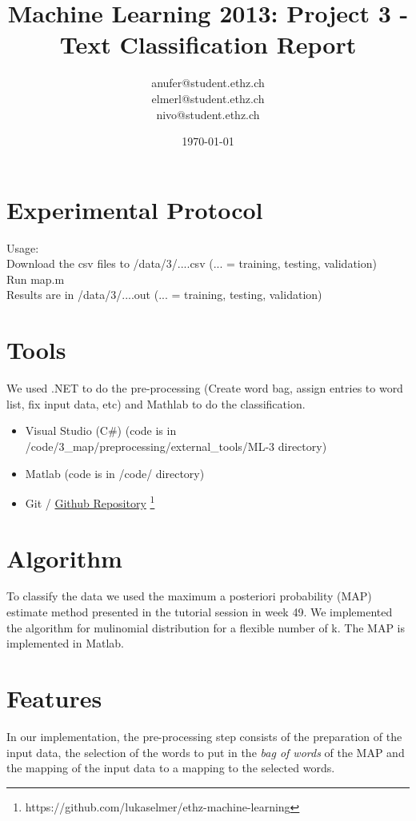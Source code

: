 \documentclass[a4paper, 11pt]{article}
\title{Machine Learning 2013: Project 3 - Text Classification Report}
\author{anufer@student.ethz.ch\\ elmerl@student.ethz.ch\\ nivo@student.ethz.ch\\}
\date{\today}
\begin{document}
\maketitle

\section*{Experimental Protocol}
Usage:\\
Download the csv files to /data/3/....csv (... = training, testing, validation)\\
Run map.m \\
Results are in /data/3/....out (... = training, testing, validation)

\section{Tools}
We used .NET to do the pre-processing (Create word bag, assign entries to word list, fix input data, etc) and Mathlab to do the classification.

\begin{itemize}
\item Visual Studio (C\#) (code is in /code/3\_map/preprocessing/external\_tools/ML-3 directory)
\item Matlab (code is in /code/ directory)
\item Git / \href{https://github.com/lukaselmer/ethz-machine-learning}{Github Repository} \footnote{https://github.com/lukaselmer/ethz-machine-learning}
\end{itemize}

\section{Algorithm}
To classify the data we used the maximum a posteriori probability (MAP) estimate method  presented in the tutorial session in week 49. We implemented the algorithm for mulinomial distribution for a flexible number of k.
The MAP is implemented in Matlab.

\section{Features}
In our implementation, the pre-processing step consists of the preparation of the input data, the selection of the words to put in the \textit{bag of words} of the MAP and the mapping of the input data to a mapping to the selected words. 
\end{document}
